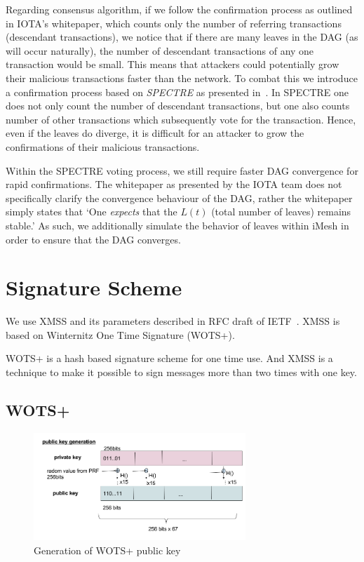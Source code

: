 \documentclass[a4paper,10pt,twocolumn]{article}
\begin{document}
Regarding consensus algorithm, if we follow the confirmation process as outlined in IOTA's whitepaper, which counts only the number of referring transactions 
(descendant transactions), we notice that if there are many leaves in the DAG (as will occur naturally), the number of 
descendant transactions of any one transaction would be small. This means that attackers could potentially grow their malicious 
transactions faster than the network. To combat this we introduce a confirmation process based on \emph{SPECTRE} as presented 
in~\cite{spectre}. In SPECTRE one does not only count the number of descendant transactions, but one also counts number of other 
transactions which subsequently vote for the transaction. Hence, even if the leaves do diverge, it is difficult for an attacker to grow 
the confirmations of their malicious transactions.

Within the SPECTRE voting process, we still require faster DAG convergence for rapid confirmations. The whitepaper as presented by the 
IOTA team does not specifically clarify the convergence behaviour of the DAG, rather the whitepaper simply states that `One 
\emph{expects} that the \( L(t) \) (total number of leaves) remains stable.' As such, we additionally simulate the behavior of leaves 
within iMesh in order to ensure that the DAG converges.

\section{Signature Scheme}
\label{sec:sig}

We use XMSS and its parameters described in RFC draft of IETF~\cite{ietf}.
XMSS is based on Winternitz One Time Signature (WOTS+). 

WOTS+ is a hash based signature scheme for one time use.
And XMSS is a technique to make it possible to sign messages more than two times with one key.

\subsection{WOTS+}

\begin{figure}[ht]
	\begin{center}
	\includegraphics[width=80mm]{wots_pub.png}
	  \caption{Generation of WOTS+ public key}
    \label{fig:wots_pub}
	\end{center}
 \end{figure}
\end{document}
